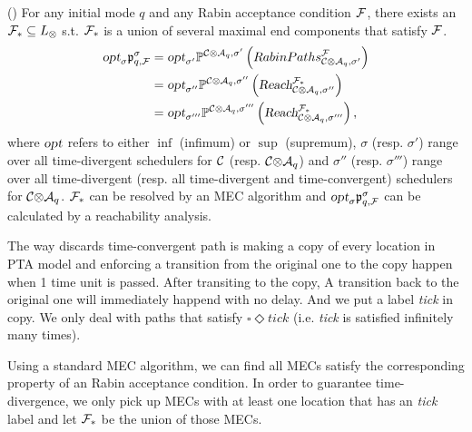 \vspace{-0.8em}
\begin{corollary}{(\cite{DBLP:conf/qest/Sproston11})}\label{crly:opt}
For any initial mode $q$ and any Rabin acceptance condition $\rabin$,
there exists an $\rabin_* \subseteq \locs_\otimes$ s.t. $\rabin_*$ is a union of several maximal end
components that satisfy $\rabin$. 
\begin{align*}
    \opt_\sigma\pr{\dtloc,\rabin}{\sigma}
        & =  
            \opt_{\sigma'}
            \probm^{\product{\pta}{\dta_\dtloc},\sigma'}\left(
                \Accept
                    {\product{\pta}{\dta_\dtloc},\sigma'}
                    {\rabin}
            \right) \\
        & = 
            \opt_{\sigma''}
            \probm^{\product{\pta}{\dta_\dtloc},\sigma''}\left(
                \omgpaths
                    {\product{\pta}{\dta_\dtloc},\sigma''}
                    {\rabin_*} 
            \right) \\
        & = 
            \opt_{\sigma'''}
            \probm^{\product{\pta}{\dta_\dtloc},\sigma'''}\left(
                \omgpaths
                    {\product{\pta}{\dta_\dtloc},\sigma'''}
                    {\rabin_*}
            \right),
\end{align*}
where $\opt$ refers to either $\inf$ (infimum) or $\sup$ (supremum),
$\sigma$ (resp. $\sigma'$) range over all time-divergent schedulers 
for $\pta$ (resp. $\product{\pta}{\dta_\dtloc}$) and $\sigma''$ (resp. 
$\sigma'''$) range over all time-divergent (resp. all time-divergent and 
time-convergent) schedulers for $\product{\pta}{\dta_\dtloc}$. $\rabin_*$ can be 
resolved by an MEC algorithm and $\opt_\sigma\pr{\dtloc,\rabin}{\sigma}$
can be calculated by a reachability analysis.
\end{corollary}
The way \cite{DBLP:conf/qest/Sproston11} discards time-convergent path
is making a copy of every location in PTA model and enforcing a transition 
from the original one to the copy happen when 1 time unit is passed. After 
transiting to the copy, A transition back to the original one will immediately
happend with no delay. And we put a label \textit{tick} in copy. We only deal with 
paths that satisfy $ \square \Diamond tick $ (i.e. \textit{tick} is satisfied 
infinitely many times).

Using a standard MEC algorithm, we can find all MECs satisfy the corresponding
property of an Rabin acceptance condition. In order to guarantee time-divergence,
we only pick up MECs with at least one location that has an \textit{tick} label and 
let $\rabin_*$ be the union of those MECs.
%
%




